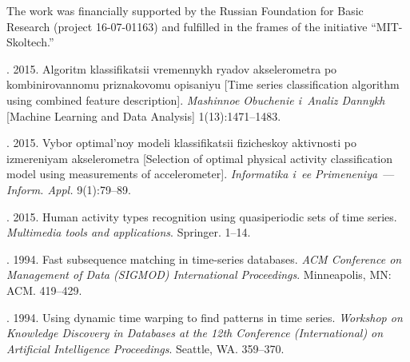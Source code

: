 

\vspace*{-12pt}

\Ack
\noindent
The work was financially supported by the Russian Foundation for
Basic Research (project 16-07-01163) 
and fulfilled in the frames of the initiative
``MIT-Skoltech.''



  \begin{multicols}{2}

\renewcommand{\bibname}{\protect\rmfamily References}

{\small\frenchspacing
 {%
 \begin{thebibliography}{99}
. 2015. 
Algoritm klassifikatsii vremennykh ryadov akselerometra po kombinirovannomu 
priznakovomu opisaniyu [Time series classification algorithm using combined 
feature description]. 
\textit{Mashinnoe Obuchenie i~Analiz Dannykh} 
[Machine Learning and Data Analysis] 1(13):1471--1483.

. 2015. Vybor optimal'noy modeli 
klassifikatsii fizicheskoy aktivnosti po izmereniyam akselerometra 
[Selection of optimal physical activity classification model using measurements 
of accelerometer]. \textit{Informatika i~ee Primeneniya}~--- \textit{Inform. Appl.} 
9(1):79--89.

. 2015. 
Human activity types recognition using quasiperiodic sets of time series. 
\textit{Multimedia tools and applications}. Springer. 1--14.

. 1994. 
Fast subsequence matching in time-series databases. 
\textit{ACM Conference on Management of Data (SIGMOD) International Proceedings}. 
Minneapolis, MN: ACM. 419--429.

. 1994. 
Using dynamic time warping to find patterns in time series. 
\textit{Workshop on Knowledge Discovery in Databases at the 12th
 Conference (International) 
 on Artificial Intelligence Proceedings}. Seattle, WA. 359--370.


\end{thebibliography}}}
\end{multicols}
